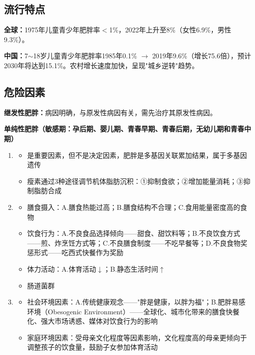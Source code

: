 \subsection{流行特点}

\begin{keybox}
\textbf{全球：}1975年儿童青少年肥胖率$<$1\%，2022年上升至8\%（女性6.9\%，男性9.3\%）。

\textbf{中国：}7$\sim$18岁儿童青少年肥胖率1985年0.1\% $\rightarrow$ 2019年9.6\%（增长75.6倍），预计2030年将达到15.1\%。农村增长速度加快，呈现"城乡逆转"趋势。
\end{keybox}

\subsection{危险因素}

\begin{keybox}
\textbf{继发性肥胖：}病因明确，与原发性病因有关，需先治疗其原发性病因。

\textbf{单纯性肥胖（敏感期：孕后期、婴儿期、青春早期、青春后期，无幼儿期和青春中期）}

\begin{enumerate}[leftmargin=*]
    \item {}
    \begin{itemize}[leftmargin=*]
        \item 是重要因素，但不是决定因素，肥胖是多基因关联累加结果，属于多基因遗传
        \item 瘦素通过3种途径调节机体脂肪沉积：①抑制食欲；②增加能量消耗；③抑制脂肪合成
    \end{itemize}
    \item {}
    \begin{itemize}[leftmargin=*]
        \item 膳食摄入：A.膳食热能过高；B.膳食结构不合理；C.食用能量密度高的食物
        \item 饮食行为：A.不良食品选择倾向——甜食、甜饮料等；B.不良饮食方式——煎、炸烹饪方式等；C.不良膳食制度——不吃早餐等；D.不良食物奖惩形式——吃西式快餐作为奖励
        \item 体力活动：A.体育活动$\downarrow$；B.静态生活时间$\uparrow$
        \item 肠道菌群
    \end{itemize}
    \item {}
    \begin{itemize}[leftmargin=*]
        \item 社会环境因素：A.传统健康观念——"胖是健康，以胖为福"；B.肥胖易感环境（Obesogenic Environment）——全球化、城市化带来的膳食快餐化、强大市场诱惑、媒体对饮食行为的影响
        \item 家庭环境因素：受母亲文化程度等因素影响，文化程度高的母亲更倾向于调整孩子的饮食量，鼓励子女参加体育活动
    \end{itemize}
\end{enumerate}
\end{keybox}


